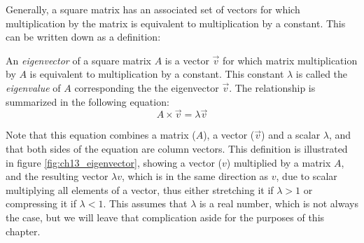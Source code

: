 \documentclass[
  letterpaper,
  DIV=11,
  numbers=noendperiod]{scrreprt}
\begin{document}
Generally, a square matrix has an associated set of vectors for which
multiplication by the matrix is equivalent to multiplication by a
constant. This can be written down as a definition:

\begin{tcolorbox}[enhanced jigsaw, arc=.35mm, colframe=quarto-callout-note-color-frame, left=2mm, opacitybacktitle=0.6, breakable, title=\textcolor{quarto-callout-note-color}{\faInfo}\hspace{0.5em}{Definition}, toprule=.15mm, coltitle=black, bottomtitle=1mm, toptitle=1mm, colback=white, leftrule=.75mm, colbacktitle=quarto-callout-note-color!10!white, titlerule=0mm, opacityback=0, rightrule=.15mm, bottomrule=.15mm]

An \emph{eigenvector} of a square matrix \(A\) is a vector \(\vec v\)
for which matrix multiplication by \(A\) is equivalent to multiplication
by a constant. This constant \(\lambda\) is called the \emph{eigenvalue}
of \(A\) corresponding the the eigenvector \(\vec v\). The relationship
is summarized in the following equation: \[
A  \times  \vec v = \lambda \vec v
\]

\end{tcolorbox}

Note that this equation combines a matrix (\(A\)), a vector (\(\vec v\))
and a scalar \(\lambda\), and that both sides of the equation are column
vectors. This definition is illustrated in figure
\ref{fig:ch13_eigenvector}, showing a vector (\(v\)) multiplied by a
matrix \(A\), and the resulting vector \(\lambda v\), which is in the
same direction as \(v\), due to scalar multiplying all elements of a
vector, thus either stretching it if \(\lambda>1\) or compressing it if
\(\lambda < 1\). This assumes that \(\lambda\) is a real number, which
is not always the case, but we will leave that complication aside for
the purposes of this chapter.
\end{document}
